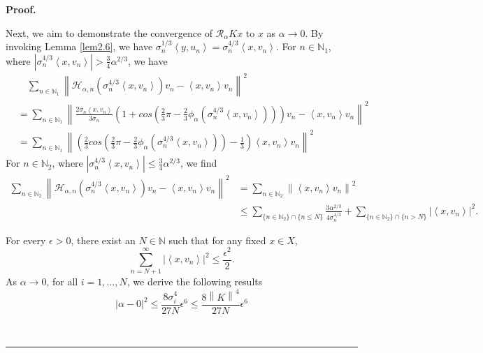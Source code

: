 \documentclass[a4paper,12pt]{article}
\numberwithin{equation}{section}
\newenvironment{proof}[1][Proof]{\textbf{#1.} }
{\ \rule{0.75em}{0.75em}\smallskip}
\begin{document}
\begin{proof}
    \par Next, we aim to demonstrate the convergence of $\mathcal{R}_{\alpha}Kx$ to $x$ as $\alpha\rightarrow 0$. By invoking Lemma \ref{lem2.6}, we have $\sigma_{n}^{1/3}\left<y,u_{n}\right>=\sigma_{n}^{4/3}\left<x,v_{n}\right>$.
     For $n\in\mathbb{N}_{1}$, where $\left|\sigma_{n}^{4/3}\left<x,v_{n}\right>\right| >\frac{3}{4}\alpha^{2/3}$, we have
    \begin{align}\label{equ3.31}
        & \quad \sum_{n\in\mathbb{N}_{1}}\left\|\mathcal{H}_{\alpha,n}\left(\sigma_{n}^{4/3}\left<x, v_{n}\right>\right)v_{n}-\left<x,v_{n}\right>v_{n}\right\|^2 \nonumber\\
        & = \sum_{n\in\mathbb{N}_{1}}\left\|\frac{2 \sigma_{n} \left<x,v_{n}\right>}{3\sigma_{n}}\left(1+cos\left(\frac{2}{3}\pi-\frac{2}{3}\phi_{\alpha}\left( \sigma_{n}^{4/3}\left<x,v_{n}\right>\right)\right)\right)v_{n} -\left<x,v_{n}\right>v_{n}\right\|^{2} \nonumber\\
        & = \sum_{n\in\mathbb{N}_{1}}\left\|\left(\frac{2}{3}cos\left(\frac{2}{3}\pi-\frac{2}{3}\phi_{\alpha}\left( \sigma_{n}^{4/3}\left<x,v_{n}\right>\right)\right)-\frac{1}{3}\right)\left<x, v_{n}\right>v_{n}\right\|^{2}
    \end{align}
    For $n\in\mathbb{N}_{2}$, where $\left|\sigma_{n}^{4/3}\left<x,v_{n}\right>\right| \leq\frac{3}{4}\alpha^{2/3}$, we find
    \begin{align}\label{equ3.32}
        \sum_{n\in\mathbb{N}_{2}}\left\|\mathcal{H}_{\alpha,n}\left(\sigma_{n}^{4/3}\left<x,v_{n}\right>\right)v_{n}-\left<x,v_{n}\right>v_{n}\right\|^2
        & = \sum_{n\in\mathbb{N}_{2}}\left\|\left<x,v_{n}\right>v_{n}\right\|^2 \nonumber\\
        & \leq \sum_{\{n\in\mathbb{N}_{2}\}\cap\{n\leq N\}}\frac{3 \alpha^{2/3}}{4\sigma_{n}^{4/3}}+\sum_{\{n\in\mathbb{N}_{2}\}\cap \{n> N\}}|\left<x,v_{n}\right>|^{2}.
    \end{align}
     \par For every $\epsilon>0$, there exist an $N\in\mathbb{N}$ such that for any fixed $x\in X$,
    \begin{equation*}
        \sum_{n=N+1}^{\infty}|\left<x,v_{n}\right>|^{2}\leq \frac{\epsilon^{2}}{2}.
    \end{equation*}
    As $\alpha\rightarrow 0$, for all $i=1,\dots,N$, we derive the following results
    \begin{equation*}
        |\alpha-0|^{2}\leq \frac{8\sigma_{i}^{4}}{27N}\epsilon^{6} \leq\frac{8\left\|K\right\|^{4}}{27N}\epsilon^{6}
    \end{equation*}

\end{proof}
\end{document}
